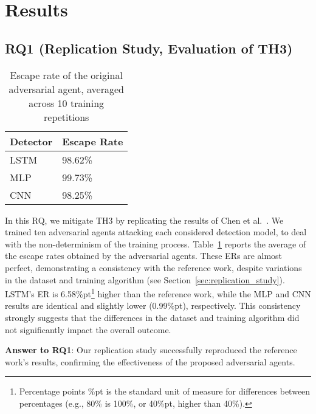 \section{Results}
\label{sec:results}


\subsection{RQ1 (Replication Study, Evaluation of TH3)}
\label{sec:rq1}

\begin{table}[!h]
\caption{Escape rate of the original adversarial agent, averaged across 10 training repetitions} \label{tab:rq1}
\centering

\begin{tabular}{ll}
    \toprule
    Detector & Escape Rate \\
    \midrule
    LSTM            & 98.62\%     \\
    MLP             & 99.73\%     \\
    CNN             & 98.25\%     \\
    \bottomrule
\end{tabular}



\end{table}

In this RQ, we mitigate TH3 by replicating the results of Chen et al.~\cite{CHEN2022102831}. We trained ten adversarial agents attacking each considered detection model, to deal with the non-determinism of the training process. Table~\ref{tab:rq1} reports the average of the escape rates obtained by the adversarial agents. These ERs are almost perfect, demonstrating a consistency with the reference work, despite variations in the dataset and training algorithm (see Section~\ref{sec:replication_study}). LSTM's ER is 6.58\%pt\footnote{Percentage points \%pt is the standard unit of measure for differences between percentages (e.g., 80\% is 100\%, or 40\%pt, higher than 40\%).} higher than the reference work, while the MLP and CNN results are identical and slightly lower (0.99\%pt), respectively. This consistency strongly suggests that the differences in the dataset and training algorithm did not significantly impact the overall outcome.



\begin{tcolorbox}[boxrule=0pt,frame hidden,sharp corners,enhanced,borderline north={1pt}{0pt}{black},borderline south={1pt}{0pt}{black},boxsep=2pt,left=2pt,right=2pt,top=2.5pt,bottom=2pt]
\textbf{Answer to RQ1}: Our replication study successfully reproduced the reference work's results, confirming the effectiveness of the proposed adversarial agents.
\end{tcolorbox}

